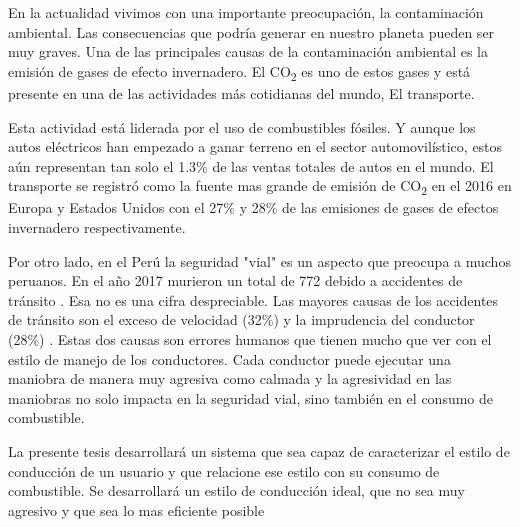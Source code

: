 \begin{introduction}

En la actualidad vivimos con una importante preocupación, la contaminación ambiental. Las consecuencias que podría generar en nuestro planeta pueden ser muy graves. Una de las principales causas de la contaminación ambiental es la emisión de gases de efecto invernadero. El CO\textsubscript{2} es uno de estos gases y está presente en una de las actividades más cotidianas del mundo, El transporte.

Esta actividad está liderada por el uso de combustibles fósiles. Y aunque los autos eléctricos han empezado a ganar terreno en el sector automovilístico, estos aún representan tan solo el 1.3\% de las ventas totales de autos en el mundo.  El transporte se registró como la fuente mas grande de emisión de CO\textsubscript{2} en el 2016 en Europa y Estados Unidos con el 27\% y 28\% de las emisiones de gases de efectos invernadero respectivamente.

Por otro lado, en el Perú la seguridad "vial"  es un aspecto que preocupa a muchos peruanos. En el año 2017 murieron un total de 772 debido a accidentes de tránsito . Esa no es una cifra despreciable. Las mayores causas de los accidentes de tránsito son el exceso de velocidad (32\%) y la imprudencia del conductor (28\%) . Estas dos causas son errores humanos que tienen mucho que ver con el estilo de manejo de los conductores. Cada conductor puede ejecutar una maniobra de manera muy agresiva como calmada y la agresividad en las maniobras no solo impacta en la seguridad vial, sino también en el consumo de combustible.

La presente tesis desarrollará un sistema que sea capaz de caracterizar el estilo de conducción de un usuario y que relacione ese estilo con su consumo de combustible. Se desarrollará un estilo de conducción ideal, que no sea muy agresivo y que sea lo mas eficiente posible


\end{introduction}
